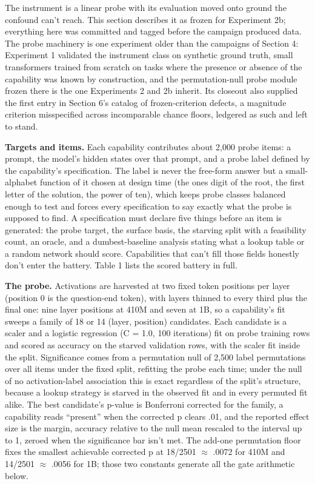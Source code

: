 The instrument is a linear probe with its evaluation moved onto ground
the confound can't reach. This section describes it as frozen for
Experiment 2b; everything here was committed and tagged before the
campaign produced data. The probe machinery is one experiment older
than the campaigns of Section 4: Experiment 1 validated the instrument
class on synthetic ground truth, small transformers trained from
scratch on tasks where the presence or absence of the capability was
known by construction, and the permutation-null probe module frozen
there is the one Experiments 2 and 2b inherit. Its closeout also
supplied the first entry in Section 6's catalog of frozen-criterion
defects, a magnitude criterion misspecified across incomparable chance
floors, ledgered as such and left to stand.

\textbf{Targets and items.} Each capability contributes about 2,000 probe
items: a prompt, the model's hidden states over that prompt, and a
probe label defined by the capability's specification. The label is
never the free-form answer but a small-alphabet function of it chosen
at design time (the ones digit of the root, the first letter of the
solution, the power of ten), which keeps probe classes balanced enough
to test and forces every specification to say exactly what the probe
is supposed to find. A specification must declare five things before
an item is generated: the probe target, the surface basis, the
starving split with a feasibility count, an oracle, and a
dumbest-baseline analysis stating what a lookup table or a random
network should score. Capabilities that can't fill those fields
honestly don't enter the battery. Table 1 lists the scored battery in
full.

\textbf{The probe.} Activations are harvested at two fixed token positions
per layer (position 0 is the question-end token), with layers thinned
to every third plus the final one: nine layer positions at 410M and
seven at 1B, so a capability's fit sweeps a family of 18 or 14
(layer, position) candidates. Each candidate is a scaler and a
logistic regression (C = 1.0, 100 iterations) fit on probe training
rows and scored as accuracy on the starved validation rows, with the
scaler fit inside the split. Significance comes from a permutation
null of 2,500 label permutations over all items under the fixed split,
refitting the probe each time; under the null of no activation-label
association this is exact regardless of the split's structure, because
a lookup strategy is starved in the observed fit and in every permuted
fit alike. The best candidate's p-value is Bonferroni corrected for
the family, a capability reads ``present'' when the corrected p clears
.01, and the reported effect size is the margin, accuracy relative to
the null mean rescaled to the interval up to 1, zeroed when the
significance bar isn't met. The add-one permutation floor fixes the
smallest achievable corrected p at 18/2501 $\approx$ .0072 for 410M and
14/2501 $\approx$ .0056 for 1B; those two constants generate all the gate
arithmetic below.

